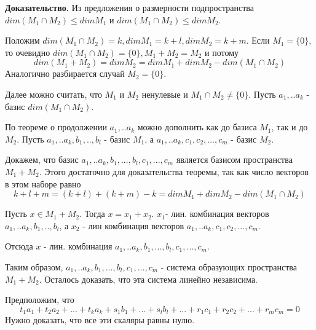 \documentclass[a4paper]{article}
\begin{document}
    \begin{hproof}
        \textbf{Доказательство.} Из предложения о размерности подпространства $dim(M_1 \cap M_2) \leq dim M_1$ и $dim(M_1 \cap M_2) \leq dim M_2$.

        Положим $dim(M_1 \cap M_2) = k, dim M_1 = k + l, dim M_2 = k + m$. Если $M_1 = \{ 0 \}$, то очевидно $dim(M_1 \cap M_2) = \{ 0 \}, M_1 + M_2  = M_2$ и потому
        \begin{equation}
            dim(M_1 + M_2) = dim M_2 = dim M_1 + dim M_2 - dim(M_1 \cap M_2)
        \end{equation}
        Аналогично разбирается случай $M_2 = \{ 0 \} $.

        Далее можно считать, что $M_1$ и $M_2$ ненулевые и $M_1 \cap M_2 \neq \{ 0 \}$. Пусть $a_1, .. a_k$ - базис $dim(M_1 \cap M_2)$.

        По теореме о продолжении $a_1, .. a_k$ можно дополнить как до базиса $M_1$, так и до $M_2$. Пусть $a_1, .. a_k, b_1, .., b_l$ - базис $M_1$, а $a_1, .. a_k,c_1, c_2, ..., c_m$ - базис $M_2$.

        Докажем, что базис $a_1, .. a_k, b_1, ..., b_l, c_1, ..., c_m$ является базисом пространства $M_1 + M_2$. Этого достаточно для доказательства теоремы, так как число векторов в этом наборе равно \begin{equation}
                                                                                                                                                                                                              k + l + m = (k+l) + (k+m) - k = dim M_1 + dim M_2 -dim (M_1 \cap M_2)
        \end{equation}

        Пусть $x \in M_1 + M_2$. Тогда $x = x_1 + x_2$. $x_1 $- лин. комбинация векторов $a_1, .. a_k, b_1, .., b_l$, а $x_2$ - лин комбинация векторов $a_1, .. a_k,c_1, c_2, ..., c_m$.

        Отсюда $x$ - лин. комбинация $a_1, .. a_k, b_1, ..., b_l, c_1, ..., c_m$.

        Таким образом, $a_1, .. a_k, b_1, ..., b_l, c_1, ..., c_m$ - система образующих пространства $M_1 + M_2$. Осталось доказать, что эта система линейно независима.

        Предположим, что
        \begin{equation}
            t_1a_1 + t_2a_2 + ... +t_ka_k + s_1b_1 + ... + s_lb_l + ... + r_1c_1 + r_2c_2 + ... + r_mc_m = 0
        \end{equation}
        Нужно доказать, что все эти скаляры равны нулю.


\end{hproof}
\end{document}
